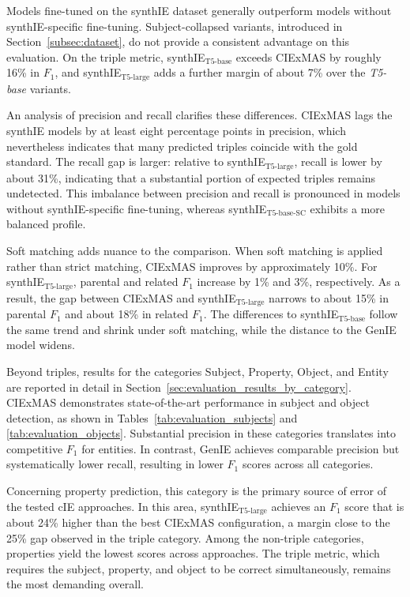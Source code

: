 \documentclass[a4paper,oneside,bibliography=totoc]{scrbook}
\begin{document}
Models fine-tuned on the synthIE dataset generally outperform models without \linebreak[4]synthIE-specific fine-tuning. Subject-collapsed variants, introduced in Section~\ref{subsec:dataset}, do not provide a consistent advantage on this evaluation. On the triple metric, \linebreak[4]synthIE$_{\text{T5-base}}$ exceeds CIExMAS by roughly 16\% in $F_1$, and synthIE$_{\text{T5-large}}$ adds a further margin of about 7\% over the \textit{T5-base} variants.

An analysis of precision and recall clarifies these differences. CIExMAS lags the synthIE models by at least eight percentage points in precision, which nevertheless indicates that many predicted triples coincide with the gold standard. The recall gap is larger: relative to synthIE$_{\text{T5-large}}$, recall is lower by about 31\%, indicating that a substantial portion of expected triples remains undetected. This imbalance between precision and recall is pronounced in models without synthIE-specific fine-tuning, whereas synthIE$_{\text{T5-base-SC}}$ exhibits a more balanced profile.

Soft matching adds nuance to the comparison. When soft matching is applied rather than strict matching, CIExMAS improves by approximately 10\%. For synthIE$_{\text{T5-large}}$, parental and related $F_1$ increase by 1\% and 3\%, respectively. As a result, the gap between CIExMAS and synthIE$_{\text{T5-large}}$ narrows to about 15\% in parental $F_1$ and about 18\% in related $F_1$. The differences to synthIE$_{\text{T5-base}}$ follow the same trend and shrink under soft matching, while the distance to the GenIE model widens.

Beyond triples, results for the categories Subject, Property, Object, and Entity are reported in detail in Section~\ref{sec:evaluation_results_by_category}. CIExMAS demonstrates state-of-the-art performance in subject and object detection, as shown in Tables~\ref{tab:evaluation_subjects} and \ref{tab:evaluation_objects}. Substantial precision in these categories translates into competitive $F_1$ for entities. In contrast, GenIE achieves comparable precision but systematically lower recall, resulting in lower $F_1$ scores across all categories.

Concerning property prediction, this category is the primary source of error of the tested \ac{cIE} approaches. In this area, synthIE$_{\text{T5-large}}$ achieves an $F_1$ score that is about 24\% higher than the best CIExMAS configuration, a margin close to the 25\% gap observed in the triple category. Among the non-triple categories, properties yield the lowest scores across approaches. The triple metric, which requires the subject, property, and object to be correct simultaneously, remains the most demanding overall.
\end{document}
